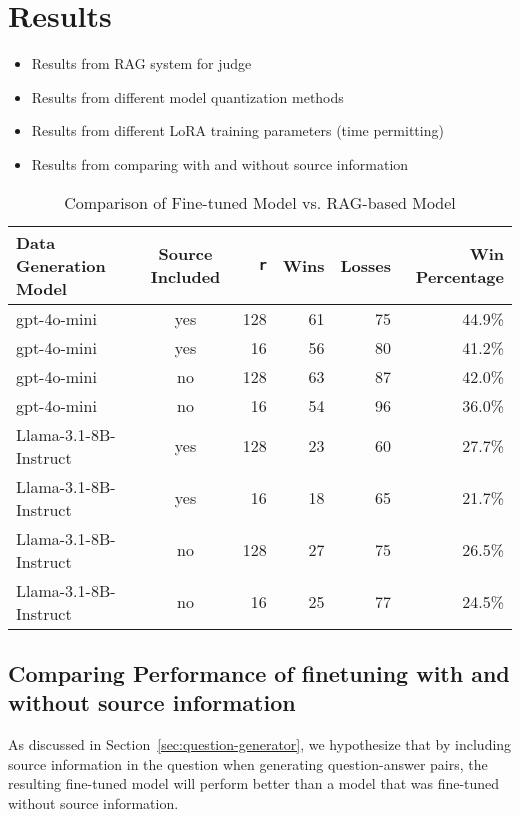 \section{Results}\label{sec:results}

\begin{itemize}
    \item Results from RAG system for judge
    \item Results from different model quantization methods
    \item Results from different LoRA training parameters (time permitting)
    \item Results from comparing with and without source information
\end{itemize}

\begin{table}[h]
\centering
\caption{Comparison of Fine-tuned Model vs. RAG-based Model}
\begin{tabular}{lcrrrr}
\hline
Data Generation Model & Source Included & \texttt{r} & Wins & Losses & Win Percentage \\
\hline
gpt-4o-mini & yes & 128 & 61 & 75 & 44.9\% \\
gpt-4o-mini & yes & 16 & 56 & 80 & 41.2\% \\
gpt-4o-mini & no & 128 & 63 & 87 & 42.0\% \\
gpt-4o-mini & no & 16 & 54 & 96 & 36.0\% \\
Llama-3.1-8B-Instruct & yes & 128 & 23 & 60 & 27.7\% \\
Llama-3.1-8B-Instruct & yes & 16 & 18 & 65 & 21.7\% \\
Llama-3.1-8B-Instruct & no & 128 & 27 & 75 & 26.5\% \\
Llama-3.1-8B-Instruct & no & 16 & 25 & 77 & 24.5\% \\
\hline
\end{tabular}
\label{tab:finetuned-vs-base}
\end{table}

\subsection{Comparing Performance of finetuning with and without source information}\label{sec:source-results}


As discussed in Section~\ref{sec:question-generator}, we hypothesize that by including source information
in the question when generating question-answer pairs, the resulting fine-tuned model will perform
better than a model that was fine-tuned without source information.

